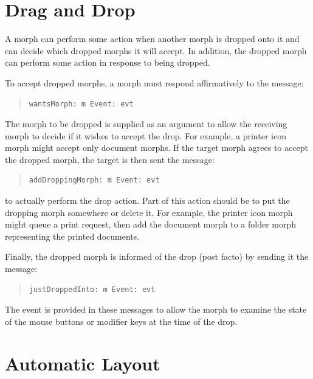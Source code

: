 \documentclass[letterpaper,10pt,english]{sphinxmanual}
\begin{document}
\section{Drag and Drop}
\label{morphic:drag-and-drop}
A morph can perform some action when another morph is dropped onto it and can decide which dropped morphs it will accept. In addition, the dropped morph can perform some action in response to being dropped.

To accept dropped morphs, a morph must respond affirmatively to the message:
\begin{quote}

\begin{Verbatim}[commandchars=\\\{\}]
wantsMorph: m Event: evt
\end{Verbatim}
\end{quote}

The morph to be dropped is supplied as an argument to allow the receiving morph to decide if it wishes to accept the drop. For example, a printer icon morph might accept only document morphs. If the target morph agrees to accept the dropped morph, the target is then sent the message:
\begin{quote}

\begin{Verbatim}[commandchars=\\\{\}]
addDroppingMorph: m Event: evt
\end{Verbatim}
\end{quote}

to actually perform the drop action. Part of this action should be to put the dropping morph somewhere or delete it. For example, the printer icon morph might queue a print request, then add the document morph to a folder morph representing the printed documents.

Finally, the dropped morph is informed of the drop (post facto) by sending it the message:
\begin{quote}

\begin{Verbatim}[commandchars=\\\{\}]
justDroppedInto: m Event: evt
\end{Verbatim}
\end{quote}

The event is provided in these messages to allow the morph to examine the state of the mouse buttons or modifier keys at the time of the drop.


\section{Automatic Layout}
\label{morphic:automatic-layout}
\end{document}
